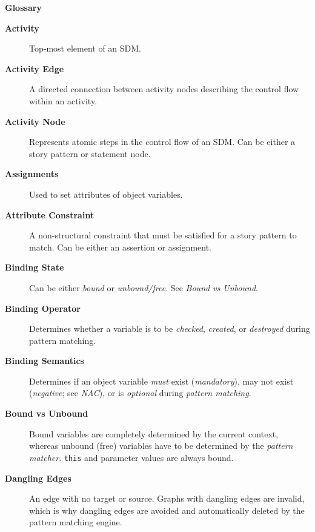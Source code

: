 \newpage
{}
{}
\hypertarget{glossary}{}

\vspace{1cm}
{\Huge \bf Glossary}
\vspace{1cm}


\begin{description}

\item[\bf Activity]
Top-most element of an SDM.

\item[\bf Activity Edge]
A directed connection between activity nodes describing the control flow within an activity.

\item[\bf Activity Node]
Represents atomic steps in the control flow of an SDM. Can be either a story pattern or statement node.

\item[\bf Assignments]
Used to set attributes of object variables.

\item[\bf Attribute Constraint]
A non-structural constraint that must be satisfied for a story pattern to match. Can be either an assertion or assignment.

\item[\bf Binding State]
Can be either \emph{bound} or \emph{unbound/free}. See \emph{Bound vs Unbound}.

\item[\bf Binding Operator]
Determines whether a variable is to be \emph{checked}, \emph{created}, or \emph{destroyed} during pattern matching.

\item[\bf Binding Semantics]
Determines if an object variable \emph{must} exist (\emph{mandatory}), may not exist (\emph{negative}; see \emph{NAC}), or is \emph{optional} during
\emph{pattern matching}.

\item[\bf Bound vs Unbound]
Bound variables are completely determined by the current context, whereas unbound (free) variables have to be determined by the \emph{pattern matcher}.
\texttt{this} and parameter values are always bound.

\item[\bf Dangling Edges]
An edge with no target or source. Graphs with dangling edges are invalid, which is why dangling edges are avoided and automatically deleted by the pattern
matching engine.


\end{description}
